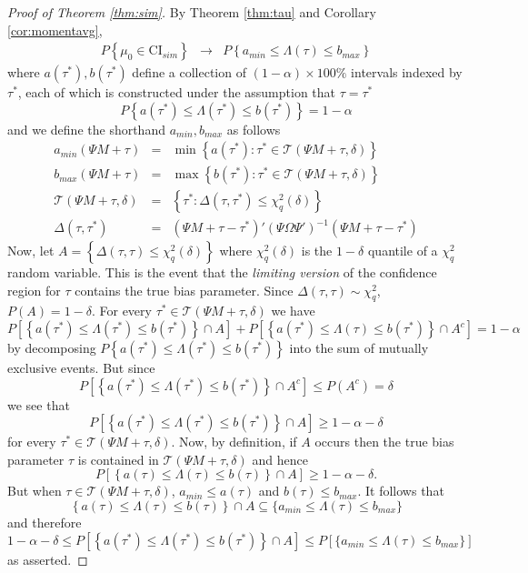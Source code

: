 \begin{proof}[Proof of Theorem \ref{thm:sim}]
By Theorem \ref{thm:tau} and Corollary \ref{cor:momentavg},
\begin{eqnarray*}
	P\left\{\mu_0 \in \mbox{CI}_{sim} \right\} %
	&\rightarrow& P \left\{ a_{min} \leq \Lambda(\tau) \leq b_{max}\right\}
\end{eqnarray*}
where $a(\tau^*), b(\tau^*)$ define a collection of $(1-\alpha)\times 100\%$ intervals indexed by $\tau^*$, each of which is constructed under the assumption that $\tau = \tau^*$
$$P\left\{a(\tau^*) \leq \Lambda(\tau^*) \leq b(\tau^*) \right\} = 1-\alpha $$
and we define the shorthand $a_{min}, b_{max}$ as follows
	\begin{eqnarray*}
	a_{min}(\Psi M + \tau)&=&\min \left\{a(\tau^*)\colon \tau^* \in \mathscr{T}(\Psi M + \tau,\delta) \right\}\\
	b_{max}(\Psi M + \tau)&=&\max \left\{b(\tau^*)\colon \tau^* \in \mathscr{T}(\Psi M + \tau,\delta) \right\}\\
	\mathscr{T}(\Psi M + \tau,\delta) &=& \left\{\tau^* \colon  \Delta(\tau, \tau^*) \leq \chi^2_q(\delta) \right\}\\
	\Delta(\tau,\tau^*) &=&  (\Psi M + \tau - \tau^*)' (\Psi\Omega\Psi')^{-1} \left(\Psi M + \tau - \tau^*\right)
	\end{eqnarray*}
Now, let $A = \left\{ \Delta(\tau, \tau) \leq \chi^2_q(\delta) \right\}$ where $\chi^2_q(\delta)$ is the $1- \delta$ quantile of a $\chi^2_q$ random variable. 
This is the event that the \emph{limiting version} of the confidence region for $\tau$ contains the true bias parameter. 
Since $\Delta(\tau, \tau)\sim\chi^2_q$, $P(A) = 1 - \delta$. For every $\tau^*\in \mathscr{T}(\Psi M + \tau,\delta)$ we have
$$P\left[\left\{a(\tau^*) \leq \Lambda(\tau^*) \leq b(\tau^*)  \right\}\cap A \right] + P\left[\left\{a(\tau^*) \leq \Lambda(\tau) \leq b(\tau^*)  \right\}\cap A^c \right] = 1-\alpha$$
by decomposing $P\left\{a(\tau^*) \leq \Lambda(\tau^*) \leq b(\tau^*) \right\} $ into the sum of mutually exclusive events. 
But since
$$P\left[\left\{a(\tau^*) \leq \Lambda(\tau^*) \leq b(\tau^*)  \right\}\cap A^c \right] \leq P(A^c) = \delta$$
we see that
$$P\left[\left\{a(\tau^*) \leq \Lambda(\tau^*) \leq b(\tau^*)  \right\}\cap A \right]  
\geq 1-\alpha-\delta$$
for every $\tau^* \in \mathscr{T}(\Psi M + \tau,\delta)$. 
Now, by definition, if $A$ occurs then the true bias parameter $\tau$ is contained in $\mathscr{T}(\Psi M + \tau,\delta)$ and hence 
$$P\left[\left\{a(\tau) \leq \Lambda(\tau) \leq b(\tau)  \right\}\cap A \right]  
\geq 1-\alpha-\delta.$$
But when $\tau \in \mathscr{T}(\Psi M + \tau,\delta)$, $a_{min} \leq a(\tau)$ and $b(\tau) \leq b_{max}$. 
It follows that
	$$\left\{a(\tau) \leq \Lambda(\tau) \leq b(\tau)  \right\}\cap A \subseteq \{a_{min} \leq \Lambda(\tau) \leq b_{max}\}$$
and therefore
	$$1 -\alpha - \delta \leq P\left[\left\{a(\tau^*) \leq \Lambda(\tau^*) \leq b(\tau^*)  \right\}\cap A \right] \leq P\left[ \{a_{min} \leq \Lambda(\tau) \leq b_{max}\}\right]$$
as asserted.
\end{proof}